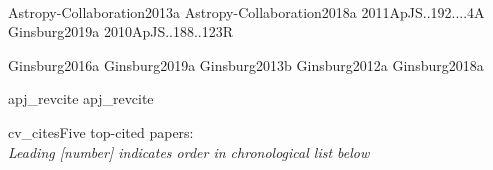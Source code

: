 \documentclass[12pt]{article}
\begin{document}

  









%




%


%



%





%
%
%
%
%



\clearpage



\nocite{biba}{Astropy-Collaboration2013a}
\nocite{biba}{Astropy-Collaboration2018a}
\nocite{biba}{2011ApJS..192....4A}
\nocite{biba}{Ginsburg2019a}
\nocite{biba}{2010ApJS..188..123R}

\nocite{bibb}{Ginsburg2016a}
\nocite{bibb}{Ginsburg2019a}
\nocite{bibb}{Ginsburg2013b}
\nocite{bibb}{Ginsburg2012a}
\nocite{bibb}{Ginsburg2018a}

{apj_revcite}
{apj_revcite}
%
%

\vspace{-18pt}
{cv_cites}{Five top-cited papers:\\ {\it Leading [number] indicates order in chronological list below}}
%
\end{document}
